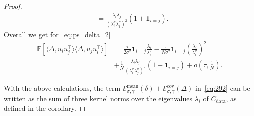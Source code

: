 \documentclass[11pt]{article}
\newcommand{\EE}{\mathbb{E}}
\newcommand{\cov}{\operatorname{Cov}}
\begin{document}
\begin{proof}
\begin{align*}
    &= \frac{\lambda_i \lambda_j}{(\lambda^\sigma_i \lambda^\sigma_j)^2}( 1  + \mathbf{1}_{i=j}) .
    \end{align*}
Overall we get for~\eqref{eq:ps_delta_2} 
\begin{equation*}
\begin{split}
     \EE[\langle \Delta, u_i u_j^\top \rangle \langle \Delta, u_j u_i^\top \rangle ]  
      &=  \frac{\tau}{2\sigma^2} \mathbf{1}_{i=j} \frac{\lambda_i}{\lambda^\sigma_i} - \frac{\tau}{N \sigma^2 } \mathbf{1}_{i=j} \left( \frac{\lambda_i}{\lambda^\sigma_i}\right)^2 \\
      &+  \frac{1}{N}\frac{\lambda_i \lambda_j}{(\lambda^\sigma_i \lambda^\sigma_j)^2}( 1  + \mathbf{1}_{i=j})  + o \left(\tau, \frac{1}{N}\right) .
\end{split}
 \end{equation*}

With the above calculations, the term $ \mathcal{E}_{\sigma, \gamma}^{\text{mean}}(\delta) + \mathcal{E}_{\sigma, \gamma}^{\text{cov}}(\Delta)$ in~\eqref{eq:292} can be written as the sum of three kernel norms over the eigenvalues $\lambda_i$ of $C_{\mathrm{data}}$, as defined in the corollary.


\end{proof}
\end{document}
